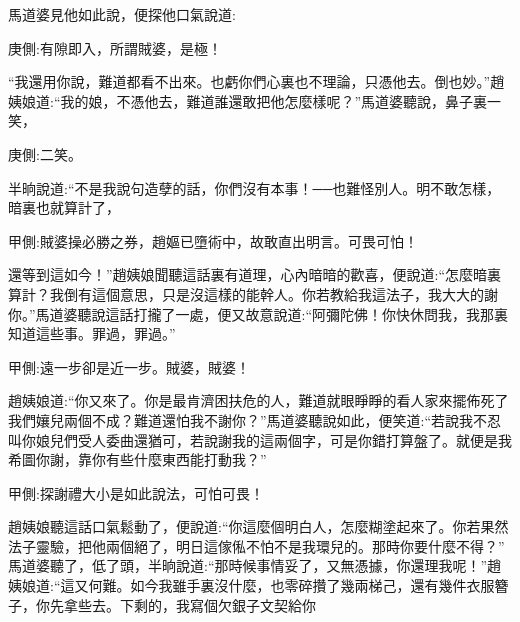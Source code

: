 \begin{parag}
    馬道婆見他如此說，便探他口氣說道:\begin{note}庚側:有隙即入，所謂賊婆，是極！\end{note}“我還用你說，難道都看不出來。也虧你們心裏也不理論，只憑他去。倒也妙。”趙姨娘道:“我的娘，不憑他去，難道誰還敢把他怎麼樣呢？”馬道婆聽說，鼻子裏一笑，\begin{note}庚側:二笑。\end{note}半晌說道:“不是我說句造孽的話，你們沒有本事！──也難怪別人。明不敢怎樣，暗裏也就算計了，\begin{note}甲側:賊婆操必勝之券，趙嫗已墮術中，故敢直出明言。可畏可怕！\end{note}還等到這如今！”趙姨娘聞聽這話裏有道理，心內暗暗的歡喜，便說道:“怎麼暗裏算計？我倒有這個意思，只是沒這樣的能幹人。你若教給我這法子，我大大的謝你。”馬道婆聽說這話打攏了一處，便又故意說道:“阿彌陀佛！你快休問我，我那裏知道這些事。罪過，罪過。”\begin{note}甲側:遠一步卻是近一步。賊婆，賊婆！\end{note}趙姨娘道:“你又來了。你是最肯濟困扶危的人，難道就眼睜睜的看人家來擺佈死了我們孃兒兩個不成？難道還怕我不謝你？”馬道婆聽說如此，便笑道:“若說我不忍叫你娘兒們受人委曲還猶可，若說謝我的這兩個字，可是你錯打算盤了。就便是我希圖你謝，靠你有些什麼東西能打動我？”\begin{note}甲側:探謝禮大小是如此說法，可怕可畏！\end{note}趙姨娘聽這話口氣鬆動了，便說道:“你這麼個明白人，怎麼糊塗起來了。你若果然法子靈驗，把他兩個絕了，明日這傢俬不怕不是我環兒的。那時你要什麼不得？” 馬道婆聽了，低了頭，半晌說道:“那時候事情妥了，又無憑據，你還理我呢！”趙姨娘道:“這又何難。如今我雖手裏沒什麼，也零碎攢了幾兩梯己，還有幾件衣服簪子，你先拿些去。下剩的，我寫個欠銀子文契給你
\end{parag}
